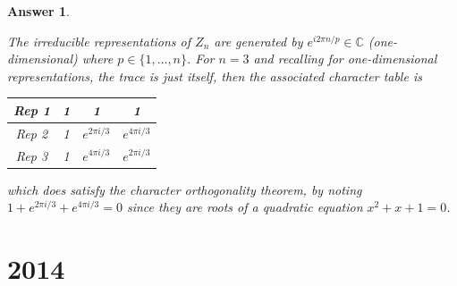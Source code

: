 \documentclass[a4paper]{article}
\newtheorem{ans}{Answer}[section]
\theoremstyle{new}
\begin{document}
\begin{ans}
\begin{enumerate}[label=(\roman*)]
\begin{enumerate}[label=(\alph*)]
The irreducible representations of $Z_n$ are generated by $e^{i2\pi n/p}\in\mathbb{C}$ (one-dimensional) where $p\in\{1,\dots,n\}$. For $n=3$ and recalling for one-dimensional representations, the trace is just itself, then the associated character table is
\begin{center}
\begin{tabular}{ |c|c|c|c| } 
\hline
   Rep 1 & 1 &1 &1\\
   \hline
   Rep 2 & 1 &$e^{2\pi i/3}$ & $e^{4\pi i/3}$\\
   \hline
   Rep 3 & 1 & $e^{4\pi i/3}$ & $e^{2\pi i/3}$\\
 \hline
\end{tabular}
\end{center}
which does satisfy the character orthogonality theorem, by noting $1+e^{2\pi i/3}+e^{4\pi i/3}=0$ since they are roots of a quadratic equation $x^2+x+1=0$.
\end{enumerate}
\end{enumerate}
\end{ans}
\newpage
\section{2014}
\end{document}
